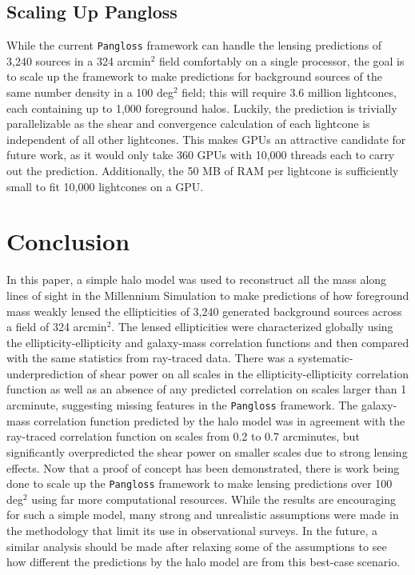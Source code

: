 \documentclass[%
 reprint,
 amsmath,amssymb,
 aps,nofootinbib
]{revtex4-1}
\begin{document}
\subsection*{Scaling Up Pangloss}

While the current \texttt{Pangloss} framework can handle the lensing predictions of 3,240 sources in a 324 arcmin$^2$ field comfortably on a single processor, the goal is to scale up the framework to make predictions for background sources of the same number density in a 100 deg$^2$ field; this will require 3.6 million lightcones, each containing up to 1,000 foreground halos. Luckily, the prediction is trivially parallelizable as the shear and convergence calculation of each lightcone is independent of all other lightcones. This makes GPUs an attractive candidate for future work, as it would only take 360 GPUs with 10,000 threads each to carry out the prediction. Additionally, the 50 MB of RAM per lightcone is sufficiently small to fit 10,000 lightcones on a GPU.

\section{Conclusion}

In this paper, a simple halo model was used to reconstruct all the mass along lines of sight in the Millennium Simulation to make predictions of how foreground mass weakly lensed the ellipticities of 3,240 generated background sources across a field of 324 arcmin$^2$. The lensed ellipticities were characterized globally using the ellipticity-ellipticity and galaxy-mass correlation functions and then compared with the same statistics from ray-traced data. There was a systematic-underprediction of shear power on all scales in the ellipticity-ellipticity correlation function as well as an absence of any predicted correlation on scales larger than 1 arcminute, suggesting missing features in the \texttt{Pangloss} framework. The galaxy-mass correlation function predicted by the halo model was in agreement with the ray-traced correlation function on scales from 0.2 to 0.7 arcminutes, but significantly overpredicted the shear power on smaller scales due to strong lensing effects. Now that a proof of concept has been demonstrated, there is work being done to scale up the \texttt{Pangloss} framework to make lensing predictions over 100 deg$^2$ using far more computational resources. While the results are encouraging for such a simple model, many strong and unrealistic assumptions were made in the methodology that limit its use in observational surveys. In the future, a similar analysis should be made after relaxing some of the assumptions to see how different the predictions by the halo model are from this best-case scenario.
\end{document}
